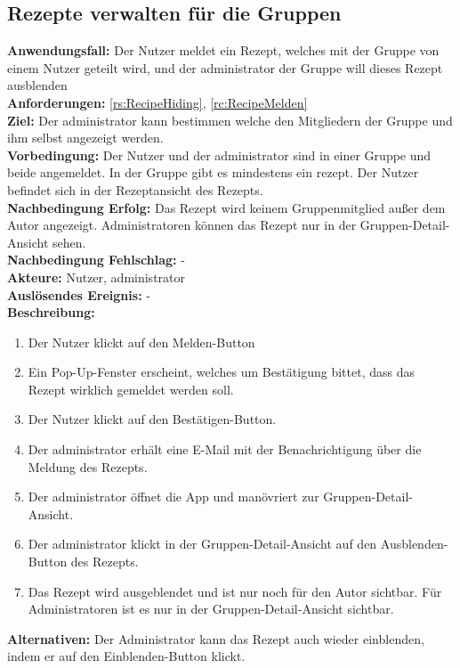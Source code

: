 \documentclass[parskip=full]{scrartcl}
\begin{document}
\subsection{Rezepte verwalten für die Gruppen}
\textbf{Anwendungsfall:} Der Nutzer meldet ein Rezept, welches mit der Gruppe von einem Nutzer geteilt wird, und der \gls{administrator} der Gruppe will dieses Rezept \gls{ausblenden}\\
\textbf{Anforderungen:} \ref{rs:RecipeHiding}, \ref{rc:RecipeMelden}\\
\textbf{Ziel:} Der \gls{administrator} kann bestimmen welche  den Mitgliedern der Gruppe und ihm selbst angezeigt werden.\\
\textbf{Vorbedingung:} Der Nutzer und der \gls{administrator} sind in einer Gruppe und beide angemeldet. In der Gruppe gibt es mindestens ein \gls{rezept}. Der Nutzer befindet sich in der Rezeptansicht des Rezepts.\\
\textbf{Nachbedingung Erfolg:} Das Rezept wird keinem Gruppenmitglied außer dem Autor angezeigt. Administratoren können das Rezept nur in der Gruppen-Detail-Ansicht sehen.\\
\textbf{Nachbedingung Fehlschlag:} -\\
\textbf{Akteure:} Nutzer, \gls{administrator}\\
\textbf{Auslösendes Ereignis:} -\\
\textbf{Beschreibung:}
\begin{enumerate}
    \item Der Nutzer klickt auf den Melden-Button
    \item Ein Pop-Up-Fenster erscheint, welches um Bestätigung bittet, dass das Rezept wirklich gemeldet werden soll.
    \item Der Nutzer klickt auf den Bestätigen-Button.
    \item Der \gls{administrator} erhält eine E-Mail mit der Benachrichtigung über die Meldung des Rezepts.
    \item Der \gls{administrator} öffnet die App und manövriert zur Gruppen-Detail-Ansicht.
    \item Der \gls{administrator} klickt in der Gruppen-Detail-Ansicht auf den Ausblenden-Button des Rezepts.
    \item Das Rezept wird ausgeblendet und ist nur noch für den Autor sichtbar. Für Administratoren ist es nur in der Gruppen-Detail-Ansicht sichtbar.
\end{enumerate}
\textbf{Alternativen:} Der Administrator kann das Rezept auch wieder einblenden, indem er auf den Einblenden-Button klickt.
\newpage
\end{document}

